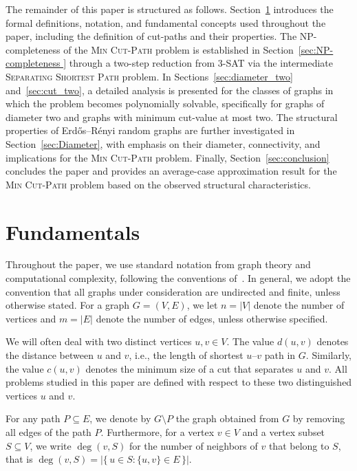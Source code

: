 \documentclass[journal ]{new-aiaa}
\numberwithin{equation}{section}
\theoremstyle{definition}
\theoremstyle{plain}
\theoremstyle{remark}
\begin{document}
The remainder of this paper is structured as follows. Section~\ref{sec:Fundamentals} introduces the formal definitions, notation, and fundamental concepts used throughout the paper, including the definition of cut-paths and their properties. The NP-completeness of the \textsc{Min Cut-Path} problem is established in Section~\ref{sec:NP-completeness } through a two-step reduction from \textsc{3-SAT} via the intermediate \textsc{Separating Shortest Path} problem. In Sections~\ref{sec:diameter_two} and~\ref{sec:cut_two}, a detailed analysis is presented for the classes of graphs in which the problem becomes polynomially solvable, specifically for graphs of diameter two and graphs with minimum cut-value at most two. The structural properties of Erdős–Rényi random graphs are further investigated in Section~\ref{sec:Diameter}, with emphasis on their diameter, connectivity, and implications for the \textsc{Min Cut-Path} problem. Finally, Section~\ref{sec:conclusion} concludes the paper and provides an average-case approximation result for the \textsc{Min Cut-Path} problem based on the observed structural characteristics.






\section{Fundamentals}
\label{sec:Fundamentals}

Throughout the paper, we use standard notation from graph theory and computational complexity, following the conventions of~\cite{Diestel2023,Cormen2022}. In general, we adopt the convention that all graphs under consideration are undirected and finite, unless otherwise stated. For a graph \(G = (V, E)\), we let \(n = |V|\) denote the number of vertices and \(m = |E|\) denote the number of edges, unless otherwise specified. 

We will often deal with two distinct vertices \(u, v \in V\). The value $d(u, v)$ denotes the distance between \(u\) and \(v\), i.e., the length of shortest \(u\)–\(v\) path in \(G\). Similarly, the value $c(u, v)$ denotes the minimum size of a cut that separates \(u\) and \(v\). All problems studied in this paper are defined with respect to these two distinguished vertices
\(u\) and \(v\). 

For any path \(P \subseteq E\), we denote by \(G \setminus P\) the graph obtained from \(G\) by removing all edges of the path \(P\). Furthermore, for a vertex \(v \in V\) and a vertex subset \(S \subseteq V\), we write \(\deg(v, S)\) for the number of neighbors of \(v\) that belong to \(S\), that is \(\deg(v, S) = |\{\,u \in S : \{u, v\} \in E\,\}|.\)
\end{document}
